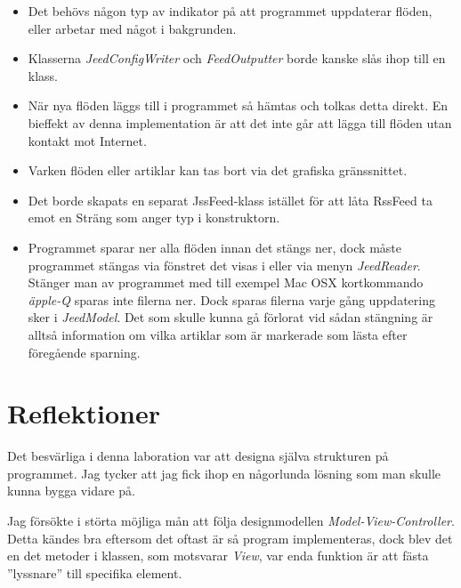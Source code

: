 \documentclass[titlepage, twoside, a4paper, 12pt]{article}
\begin{document}
\begin{itemize}
\item Det behövs någon typ av indikator på att programmet uppdaterar flöden,
eller arbetar med något i bakgrunden.

\item Klasserna \textit{JeedConfigWriter} och \textit{FeedOutputter} borde
kanske slås ihop till en klass.

\item När nya flöden läggs till i programmet så hämtas och tolkas detta
direkt. En bieffekt av denna implementation är att det inte går att
lägga till flöden utan kontakt mot Internet.

\item Varken flöden eller artiklar kan tas bort via det grafiska
gränssnittet.

\item Det borde skapats en separat JssFeed-klass istället för att låta
  RssFeed ta emot en Sträng som anger typ i konstruktorn.

\item Programmet sparar ner alla flöden innan det stängs ner, dock
  måste programmet stängas via fönstret det visas i eller via menyn
  \textit{JeedReader}. Stänger man av programmet med till exempel Mac OSX
  kortkommando \textit{äpple-Q} sparas inte filerna ner. Dock sparas
  filerna varje gång uppdatering sker i \textit{JeedModel}. Det som
  skulle kunna gå förlorat vid sådan stängning är alltså information
  om vilka artiklar som är markerade som lästa efter föregående
  sparning.
\end{itemize}

\section{Reflektioner}\label{Reflektioner}

Det besvärliga i denna laboration var att designa själva strukturen på
programmet. Jag tycker att jag fick ihop en någorlunda lösning som man
skulle kunna bygga vidare på.

Jag försökte i störta möjliga mån att följa designmodellen
\textit{Model-View-Controller}. Detta kändes bra eftersom det oftast
är så program implementeras, dock blev det en det metoder i klassen,
som motsvarar \textit{View}, var enda funktion är att fästa
''lyssnare'' till specifika element.
\end{document}
